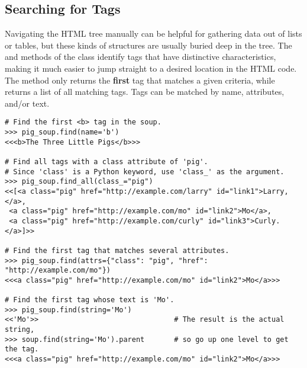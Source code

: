 \subsection*{Searching for Tags} %

Navigating the HTML tree manually can be helpful for gathering data out of lists or tables, but these kinds of structures are usually buried deep in the tree.
The  and  methods of the  class identify tags that have distinctive characteristics, making it much easier to jump straight to a desired location in the HTML code.
The  method only returns the \textbf{first} tag that matches a given criteria, while  returns a list of all matching tags.
Tags can be matched by name, attributes, and/or text.

\begin{lstlisting}
# Find the first <b> tag in the soup.
>>> pig_soup.find(name='b')
<<<b>The Three Little Pigs</b>>>

# Find all tags with a class attribute of 'pig'.
# Since 'class' is a Python keyword, use 'class_' as the argument.
>>> pig_soup.find_all(class_="pig")
<<[<a class="pig" href="http://example.com/larry" id="link1">Larry,</a>,
 <a class="pig" href="http://example.com/mo" id="link2">Mo</a>,
 <a class="pig" href="http://example.com/curly" id="link3">Curly.</a>]>>

# Find the first tag that matches several attributes.
>>> pig_soup.find(attrs={"class": "pig", "href": "http://example.com/mo"})
<<<a class="pig" href="http://example.com/mo" id="link2">Mo</a>>>

# Find the first tag whose text is 'Mo'.
>>> pig_soup.find(string='Mo')
<<'Mo'>>                                # The result is the actual string,
>>> soup.find(string='Mo').parent       # so go up one level to get the tag.
<<<a class="pig" href="http://example.com/mo" id="link2">Mo</a>>>
\end{lstlisting}


